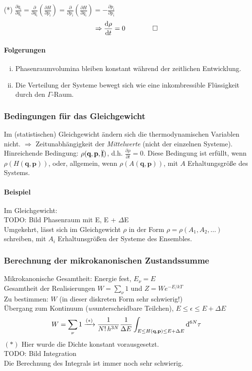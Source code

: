 (*) $\frac{\partial \dot{q}_i}{\partial q_i} = \frac{\partial}{\partial q_i} \left( \frac{\partial H}{\partial p_i} \right) = \frac{\partial}{\partial p_i} \left( \frac{\partial H}{\partial q_i} \right) = - \frac{\partial \dot{p}_i}{\partial p_i}$
\begin{equation}
    \Rightarrow \frac{\mathrm{d} \rho}{\mathrm{d} t} = 0 \qquad \qquad \square
\end{equation}
\paragraph{Folgerungen}
\begin{enumerate}[i)]
    \item Phasenraumvolumina bleiben konstant während der zeitlichen Entwicklung.
    \item Die Verteilung der Systeme bewegt sich wie eine inkombressible Flüssigkeit durch den $\Gamma$-Raum.
\end{enumerate}
\subsubsection{Bedingungen für das Gleichgewicht}
Im (statistischen) Gleichgewicht ändern sich die thermodynamischen Variablen nicht. $\Rightarrow$ Zeitunabhängigkeit der \emph{Mittelwerte}
(nicht der einzelnen Systeme). Hinreichende Bedingung: $\rho(\textbf{q}, \textbf{p}, \xcancel{t})$, d.h. $\frac{\partial \rho}{\partial t} = 0$.
Diese Bedingung ist erfüllt, wenn $\rho(H(\textbf{q}, \textbf{p}))$, oder, allgemein, wenn $\rho(A(\textbf{q}, \textbf{p}))$, mit $A$ Erhaltungsgröße
des Systems.
\paragraph{Beispiel} Im Gleichgewicht: \\
TODO: Bild Phasenraum mit E, E + $\Delta$E \\ %
Umgekehrt, lässt sich im Gleichgewicht $\rho$ in der Form $\rho=\rho(A_1, A_2, \ldots)$ schreiben, mit $A_i$ Erhaltunsgrößen der Systeme des Ensembles.

\subsubsection{Berechnung der mikrokanonischen Zustandssumme}
Mikrokanonische Gesamtheit: Energie fest, $E_\nu = E$ \\
Gesamtheit der Realisierungen $W = \sum_{\nu} 1 $ und $Z = W e^{-E/kT}$ \\
Zu bestimmen: $W$ (in dieser diskreten Form sehr schwierig!) \\
Übergang zum Kontinuum (\emph{un}unterscheidbare Teilchen), $E \leq \epsilon \leq E + \Delta E$
\begin{equation}
    W = \sum_\nu 1 \xrightarrow{(*)} \frac{1}{N! \, h^{3N}} \frac{1}{\Delta E} \int_{E \leq H(\textbf{q}, \textbf{p}) \leq E + \Delta E} \mathrm{d}^{6N} \tau
\end{equation}
$(*)$ Hier wurde die Dichte konstant vorausgesetzt. \\
TODO: Bild Integration \\ %
Die Berechnung des Integrals ist immer noch sehr schwierig.
